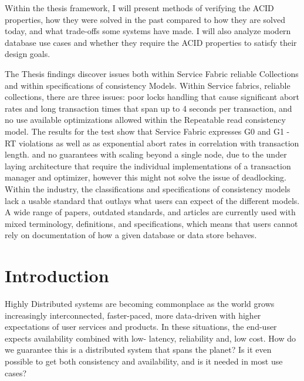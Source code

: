 \documentclass[a4paper,10pt,titlepage]{report}
\begin{document}
    Within the thesis framework, I will present methods of verifying the ACID properties, how they were solved in the past compared to how they are solved today, and what trade-offs some systems have made. I will also analyze modern database use cases and whether they require the ACID properties to satisfy their design goals.\\
    \vspace{5mm}


    The Thesis findings discover issues both within Service Fabric reliable Collections and within specifications of consistency Models. 
    Within Service fabrics, reliable collections, there are three issues: poor locks handling that cause significant abort rates and long transaction times that span up to 4 seconds per transaction,  and no use available optimizations allowed within the Repeatable read consistency model. 
    The results for the test show that Service Fabric expresses G0 and G1 -RT violations as well as as exponential abort rates in correlation with transaction length. and no guarantees with scaling beyond a single node, due to the under laying architecture that require the individual  implementations of a transaction manager and optimizer, however this might not solve the issue of deadlocking.
    Within the industry, the classifications and specifications of consistency models lack a usable standard that outlays what users can expect of the different models.
    A wide range of papers, outdated standards, and articles are currently used with mixed terminology, definitions, and specifications, which means that users cannot rely on documentation of how a given database or data store behaves.




    \chapter{Introduction}
    Highly Distributed systems are becoming commonplace as the world grows increasingly interconnected, faster-paced, more data-driven with higher expectations of user services and products. In these situations, the end-user expects availability combined with low- latency, reliability and, low cost. How do we guarantee this is a distributed system that spans the planet? Is it even possible to get both consistency and availability, and is it needed in most use cases?\\
    \vspace{5mm}
\end{document}
